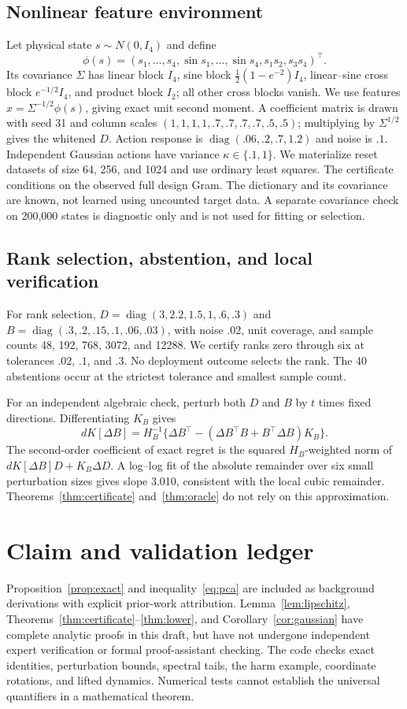 \subsection{Nonlinear feature environment}
Let physical state $s\sim N(0,I_4)$ and define
\[
 \phi(s)=(s_1,\ldots,s_4,\sin s_1,\ldots,\sin s_4,s_1s_2,s_3s_4)^\top.
\]
Its covariance $\Sigma$ has linear block $I_4$, sine block $\frac12(1-e^{-2})I_4$, linear--sine cross block $e^{-1/2}I_4$, and product block $I_2$; all other cross blocks vanish. We use features $x=\Sigma^{-1/2}\phi(s)$, giving exact unit second moment. A coefficient matrix is drawn with seed 31 and column scales $(1,1,1,1,.7,.7,.7,.7,.5,.5)$; multiplying by $\Sigma^{1/2}$ gives the whitened $D$. Action response is $\operatorname{diag}(.06,.2,.7,1.2)$ and noise is $.1$. Independent Gaussian actions have variance $\kappa\in\{.1,1\}$. We materialize reset datasets of size 64, 256, and 1024 and use ordinary least squares. The certificate conditions on the observed full design Gram. The dictionary and its covariance are known, not learned using uncounted target data. A separate covariance check on 200,000 states is diagnostic only and is not used for fitting or selection.

\subsection{Rank selection, abstention, and local verification}
For rank selection, $D=\operatorname{diag}(3,2.2,1.5,1,.6,.3)$ and $B=\operatorname{diag}(.3,.2,.15,.1,.06,.03)$, with noise $.02$, unit coverage, and sample counts 48, 192, 768, 3072, and 12288. We certify ranks zero through six at tolerances $.02$, $.1$, and $.3$. No deployment outcome selects the rank. The 40 abstentions occur at the strictest tolerance and smallest sample count.



For an independent algebraic check, perturb both $D$ and $B$ by $t$ times fixed directions. Differentiating $K_B$ gives
\[
 dK[\Delta B]=H_B^{-1}\{\Delta B^\top-(\Delta B^\top B+B^\top\Delta B)K_B\}.
\]
The second-order coefficient of exact regret is the squared $H_B$-weighted norm of $dK[\Delta B]D+K_B\Delta D$. A log--log fit of the absolute remainder over six small perturbation sizes gives slope 3.010, consistent with the local cubic remainder. Theorems~\ref{thm:certificate} and~\ref{thm:oracle} do not rely on this approximation.

\section{Claim and validation ledger}
Proposition~\ref{prop:exact} and inequality~\eqref{eq:pca} are included as background derivations with explicit prior-work attribution. Lemma~\ref{lem:lipschitz}, Theorems~\ref{thm:certificate}--\ref{thm:lower}, and Corollary~\ref{cor:gaussian} have complete analytic proofs in this draft, but have not undergone independent expert verification or formal proof-assistant checking. The code checks exact identities, perturbation bounds, spectral tails, the harm example, coordinate rotations, and lifted dynamics. Numerical tests cannot establish the universal quantifiers in a mathematical theorem.

